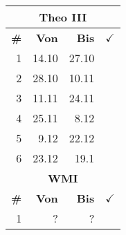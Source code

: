 \documentclass{article}
\begin{document}
\begin{table}
\begin{tabular}{r|r|r|l}
        \multicolumn{4}{c}{\textbf{Theo III}}\\
        \hline
        \hline
        \textbf{\#}&
        \textbf{Von}&
        \textbf{Bis}&
        $\checkmark$\\
        \hline
        \hline
        1&14.10&27.10\\
        2&28.10&10.11\\
        3&11.11&24.11\\
        4&25.11&8.12\\
        5&9.12&22.12\\
        6&23.12&19.1\\
        \hline
        \hline

        \multicolumn{4}{c}{\textbf{WMI}}\\
        \hline
        \hline
        \textbf{\#}&
        \textbf{Von}&
        \textbf{Bis}&
        $\checkmark$\\
        \hline
        \hline
        1&?&?
    \end{tabular}
\end{table}
\end{document}
